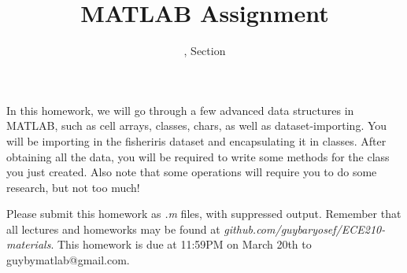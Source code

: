 \documentclass[11pt]{article}
\title{MATLAB Assignment \Homework}
\author{\Session, Section \Section}
\date{}
\makeatletter
\def\MyEmail{guybymatlab@gmail.com}
\def\DateOfSubmission{March 20th }
\makeatother
\begin{document}
\maketitle
In this homework, we will go through a few advanced data structures in MATLAB,
such as cell arrays, classes, chars, as well as dataset-importing.
You will be importing in the fisheriris dataset and encapsulating it in classes.
After obtaining all the data, you will be required to write some methods for
the class you just created.
Also note that some operations will require you to do some research, but not too much!

Please submit this homework as \textit{.m} files, 
with suppressed output.
Remember that all lectures and homeworks may be found at 
\textit{github.com/guybaryosef/ECE210-materials}.
This homework is due at 11:59PM on \DateOfSubmission to \MyEmail. 
\end{document}

